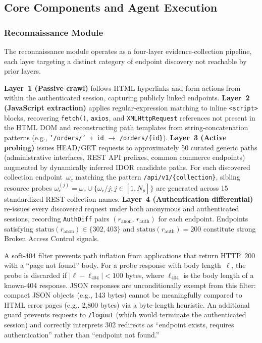 \subsection{Core Components and Agent Execution}
\label{subsec:components}

\subsubsection{Reconnaissance Module}

The reconnaissance module operates as a four-layer evidence-collection
pipeline, each layer targeting a distinct category of endpoint discovery
not reachable by prior layers.

\textbf{Layer~1 (Passive crawl)} follows HTML hyperlinks and form
actions from within the authenticated session, capturing publicly linked
endpoints.
\textbf{Layer~2 (JavaScript extraction)} applies regular-expression
matching to inline \verb|<script>| blocks, recovering \texttt{fetch()},
\texttt{axios}, and \texttt{XMLHttpRequest} references not present in
the HTML DOM and reconstructing path templates from string-concatenation
patterns (e.g., \texttt{'/orders/' + id} $\to$ \texttt{/orders/\{id\}}).
\textbf{Layer~3 (Active probing)} issues HEAD/GET requests to
approximately 50 curated generic paths (administrative interfaces, REST
API prefixes, common commerce endpoints) augmented by dynamically
inferred IDOR candidate paths.
For each discovered collection endpoint~$\omega_c$ matching the pattern
\texttt{/api/v1/\{collection\}}, sibling resource probes
$\omega_c^{(j)} = \omega_c \cup \{{\omega_c}/{j} : j \in [1, N_p]\}$
are generated across 15 standardized REST collection names.
\textbf{Layer~4 (Authentication differential)} re-issues every
discovered request under both anonymous and authenticated sessions,
recording \texttt{AuthDiff} pairs
$(r_{\mathrm{anon}},\, r_{\mathrm{auth}})$ for each endpoint.
Endpoints satisfying
$\mathrm{status}(r_{\mathrm{anon}}) \in \{302, 403\}$
and
$\mathrm{status}(r_{\mathrm{auth}}) = 200$
constitute strong Broken Access Control signals.

A soft-404 filter prevents path inflation from applications that return
HTTP~200 with a ``page not found'' body.
For a probe response with body length~$\ell$, the probe is discarded if
$|\ell - \ell_{404}| < 100$ bytes, where $\ell_{404}$ is the body length
of a known-404 response.
JSON responses are unconditionally exempt from this filter: compact JSON
objects (e.g., 143 bytes) cannot be meaningfully compared to HTML error
pages (e.g., 2,800 bytes) via a byte-length heuristic.
An additional guard prevents requests to \texttt{/logout} (which would
terminate the authenticated session) and correctly interprets 302
redirects as ``endpoint exists, requires authentication'' rather than
``endpoint not found.''

